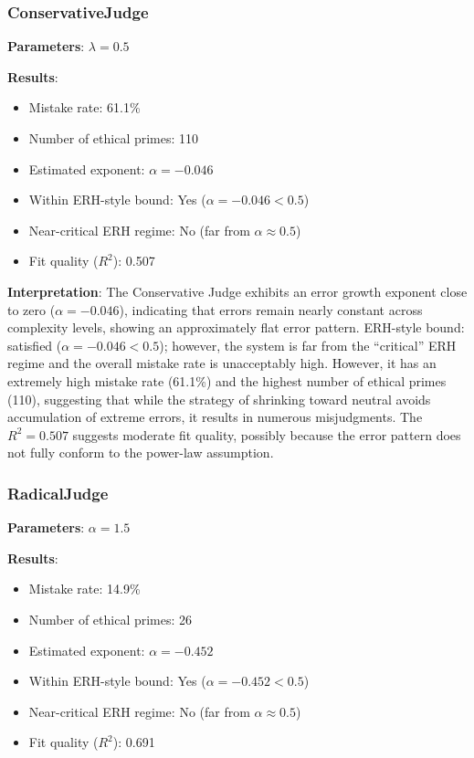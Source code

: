 \documentclass[12pt,a4paper]{article}
\theoremstyle{definition}
\theoremstyle{remark}
\begin{document}
\subsubsection{ConservativeJudge}

\textbf{Parameters}: $\lambda = 0.5$

\textbf{Results}:
\begin{itemize}
    \item Mistake rate: 61.1\%
    \item Number of ethical primes: 110
    \item Estimated exponent: $\alpha = -0.046$
    \item Within ERH-style bound: Yes ($\alpha = -0.046 < 0.5$)
    \item Near-critical ERH regime: No (far from $\alpha \approx 0.5$)
    \item Fit quality ($R^2$): 0.507
\end{itemize}

\textbf{Interpretation}: The Conservative Judge exhibits an error growth exponent close to zero ($\alpha = -0.046$), indicating that errors remain nearly constant across complexity levels, showing an approximately flat error pattern. ERH-style bound: satisfied ($\alpha = -0.046 < 0.5$); however, the system is far from the ``critical'' ERH regime and the overall mistake rate is unacceptably high. However, it has an extremely high mistake rate (61.1\%) and the highest number of ethical primes (110), suggesting that while the strategy of shrinking toward neutral avoids accumulation of extreme errors, it results in numerous misjudgments. The $R^2 = 0.507$ suggests moderate fit quality, possibly because the error pattern does not fully conform to the power-law assumption.

\subsubsection{RadicalJudge}

\textbf{Parameters}: $\alpha = 1.5$

\textbf{Results}:
\begin{itemize}
    \item Mistake rate: 14.9\%
    \item Number of ethical primes: 26
    \item Estimated exponent: $\alpha = -0.452$
    \item Within ERH-style bound: Yes ($\alpha = -0.452 < 0.5$)
    \item Near-critical ERH regime: No (far from $\alpha \approx 0.5$)
    \item Fit quality ($R^2$): 0.691
\end{itemize}
\end{document}

